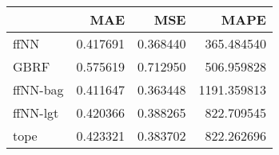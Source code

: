 \begin{tabular}{lrrr}
\toprule
{} &       MAE &       MSE &         MAPE \\
\midrule
ffNN     &  0.417691 &  0.368440 &   365.484540 \\
GBRF     &  0.575619 &  0.712950 &   506.959828 \\
ffNN-bag &  0.411647 &  0.363448 &  1191.359813 \\
ffNN-lgt &  0.420366 &  0.388265 &   822.709545 \\
tope     &  0.423321 &  0.383702 &   822.262696 \\
\bottomrule
\end{tabular}
